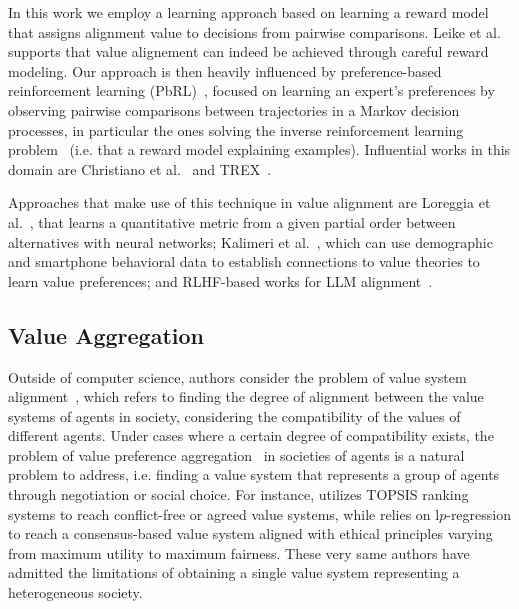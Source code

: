 \documentclass{ecai}
\begin{document}
In this work we employ a learning approach based on learning a reward model that assigns alignment value to decisions from pairwise comparisons. Leike et al.~\cite{Leike2018ScalableAA,leike2020} supports that value alignement can indeed be achieved through careful reward modeling. Our approach is then heavily influenced by preference-based reinforcement learning (PbRL)~\cite{surveyRLFromPreferencesPbRL,kaufmann2024survey}, focused on learning an expert's preferences by observing pairwise comparisons between trajectories in a Markov decision processes, in particular the ones solving the inverse reinforcement learning problem~\cite{ng2000algorithms} (i.e. that a reward model explaining examples). Influential works in this domain are Christiano et al.~\cite{christiano2023deeprlpreferences} and TREX~\cite{trexpreferences2019,brown2019betterthandemonstratorimitationlearningautomaticallyranked}. 

Approaches that make use of this technique in value alignment are Loreggia et al.~\cite{Loreggia2019MetricPreferencesAlignment}, that learns a quantitative metric from a given partial order between alternatives with neural networks; Kalimeri et al.~\cite{Kalimeri2019}, which can use demographic and smartphone behavioral data to establish connections to value theories to learn value preferences; and RLHF-based works for LLM alignment~\cite{dpoLLM2023}.


\subsection{Value Aggregation}

Outside of computer science, authors consider the problem of value system alignment~\cite{Macedo2007ValueSystemInCollaborativeNetworks,Camarinha-Matos2008ANALYSISOFCORE-VALUESinColaborativeNetworks,Macedo2013ValueSystemAlignmentICollaborativeEnvironments}, which refers to finding the degree of alignment between the value systems of agents in society, considering the compatibility of the values of different agents. Under cases where a certain degree of compatibility exists, the problem of value preference aggregation~\cite{Liscio2023} in societies of agents is a natural problem to address, i.e. finding a value system that represents a group of agents through negotiation or social choice. For instance, \cite{eaa24AaronTOPSISValueAggregation,AaronAgreementTOPSIS} utilizes TOPSIS ranking systems to reach conflict-free or agreed value systems, while \cite{leraleri2024aggregation} relies on l$p$-regression to reach a consensus-based value system aligned with ethical principles varying from maximum utility to maximum fairness. These very same authors have admitted the limitations of obtaining a single value system representing a heterogeneous society.
\end{document}
